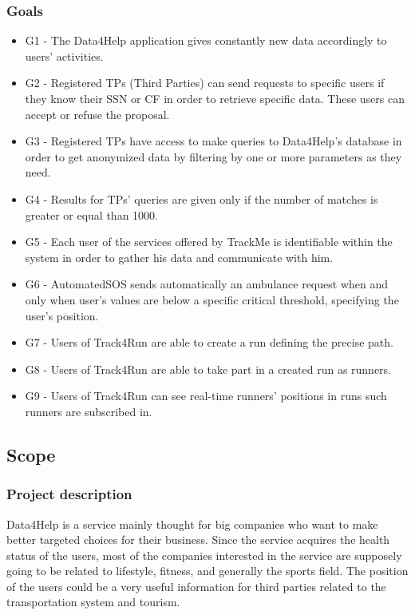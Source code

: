 {\color{secblue}\subsubsection{Goals}}
\begin{itemize}
\item G1 - The Data4Help application gives constantly new data accordingly to users' activities.
\item G2 - Registered TPs (Third Parties) can send requests to specific users if they know their SSN or CF in order to retrieve specific data. These users can accept or refuse the proposal.
\item G3 - Registered TPs have access to make queries to Data4Help's database in order to get anonymized data by filtering by one or more parameters as they need.
\item G4 - Results for TPs' queries are given only if the number of matches is greater or equal than 1000.
\item G5 - Each user of the services offered by TrackMe is identifiable within the system in order to gather his data and communicate with him.
\item G6 - AutomatedSOS sends automatically an ambulance request when and only when user's values are below a specific critical threshold, specifying the user's position.
\item G7 - Users of Track4Run are able to create a run defining the precise path.
\item G8 - Users of Track4Run are able to take part in a created run as runners.
\item G9 - Users of Track4Run can see real-time runners' positions in runs such runners are subscribed in.
\end{itemize}
{\color{secblue}\subsection{Scope}}
{\color{secblue}\subsubsection{Project description}}
Data4Help is a service mainly thought for big companies who want to make better targeted choices for their business. Since the service acquires the health status of the users, most of the companies interested in the service are supposely going to be related to lifestyle, fitness, and generally the sports field.
The position of the users could be a very useful information for third parties related to the transportation system and tourism.

